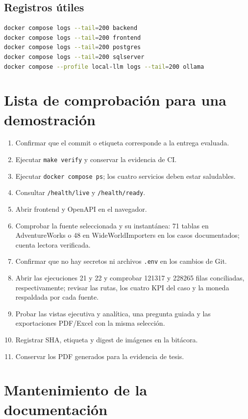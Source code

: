 \documentclass[11pt,letterpaper]{article}
\newcommand{\file}[1]{\texttt{#1}}
\begin{document}
\subsection{Registros útiles}

\begin{lstlisting}[style=terminal,language=bash]
docker compose logs --tail=200 backend
docker compose logs --tail=200 frontend
docker compose logs --tail=200 postgres
docker compose logs --tail=200 sqlserver
docker compose --profile local-llm logs --tail=200 ollama
\end{lstlisting}

\section{Lista de comprobación para una demostración}

\begin{enumerate}
  \item Confirmar que el commit o etiqueta corresponde a la entrega evaluada.
  \item Ejecutar \file{make verify} y conservar la evidencia de CI.
  \item Ejecutar \file{docker compose ps}; los cuatro servicios deben estar saludables.
  \item Consultar \file{/health/live} y \file{/health/ready}.
  \item Abrir frontend y OpenAPI en el navegador.
  \item Comprobar la fuente seleccionada y su instantánea: 71 tablas en AdventureWorks o 48 en WideWorldImporters en los casos documentados; cuenta lectora verificada.
  \item Confirmar que no hay secretos ni archivos \file{.env} en los cambios de Git.
  \item Abrir las ejecuciones 21 y 22 y comprobar 121317 y 228265 filas conciliadas, respectivamente; revisar las rutas, los cuatro KPI del caso y la moneda respaldada por cada fuente.
  \item Probar las vistas ejecutiva y analítica, una pregunta guiada y las exportaciones PDF/Excel con la misma selección.
  \item Registrar SHA, etiqueta y digest de imágenes en la bitácora.
  \item Conservar los PDF generados para la evidencia de tesis.
\end{enumerate}

\section{Mantenimiento de la documentación}
\end{document}
